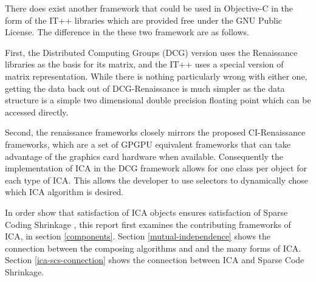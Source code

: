 \documentclass[12pt ]{article}
\begin{document}
There does exist another framework that could be used in Objective-C in the form of the IT++ libraries which are provided free under the GNU Public License.   The difference in the these two framework are as follows.  

First, the Distributed Computing Groups (DCG) version uses the Renaissance libraries as the basis for its matrix, and the IT++ uses a special version of matrix representation.   While there is nothing particularly wrong with either one, getting the data back out of DCG-Renaissance is much simpler as the data structure is a simple two dimensional double precision floating point which can be accessed directly.   

Second, the renaissance frameworks closely mirrors the proposed CI-Renaissance frameworks, which are a set of GPGPU equivalent frameworks that can take advantage of the graphics card hardware when available.   %
Consequently the implementation of ICA in the DCG framework %
 allows for one class per object for each type of ICA.  This allows the developer to use selectors to dynamically chose which ICA algorithm is desired.




In order show that satisfaction of ICA objects ensures satisfaction of Sparse Coding Shrinkage%
, this report first examines the contributing frameworks of ICA, in section \ref{components}.   Section \ref{mutual-independence} shows the connection between the composing algorithms and and the many forms of ICA.   Section \ref{ica-scs-connection} shows the connection between ICA and Sparse Code Shrinkage. %
\end{document}
